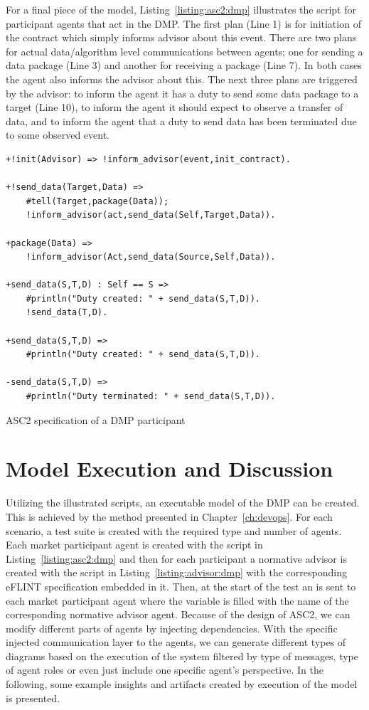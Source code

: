 For a final piece of the model, Listing~\ref{listing:asc2:dmp} illustrates the script for participant agents that act in the DMP. The first plan (Line 1) is for initiation of the contract which simply informs advisor about this event. There are two plans for actual data/algorithm level communications between agents; one for sending a data package (Line 3) and another for receiving a package (Line 7). In both cases the agent also informs the advisor about this. The next three plans are triggered by the advisor: to inform the agent it has a duty to send some data package to a target (Line 10), to inform the agent it should expect to observe a transfer of data, and to inform the agent that a duty to send data has been terminated due to some observed event.

\begin{listing}[!tbh]
\begin{verbatim}
+!init(Advisor) => !inform_advisor(event,init_contract).

+!send_data(Target,Data) =>
    #tell(Target,package(Data));
    !inform_advisor(act,send_data(Self,Target,Data)).

+package(Data) =>
    !inform_advisor(Act,send_data(Source,Self,Data)).

+send_data(S,T,D) : Self == S =>
    #println("Duty created: " + send_data(S,T,D)).
    !send_data(T,D).

+send_data(S,T,D) =>
    #println("Duty created: " + send_data(S,T,D)).

-send_data(S,T,D) =>
    #println("Duty terminated: " + send_data(S,T,D)).
\end{verbatim}
\caption{ASC2 specification of a DMP participant}

\label{listing:asc2:dmp}
\end{listing}

\section{Model Execution and Discussion}
Utilizing the illustrated scripts, an executable model of the DMP can be created. This is achieved by the method presented in Chapter~\ref{ch:devops}. For each scenario, a test suite is created with the required type and number of agents. Each market participant agent is created with the script in Listing~\ref{listing:asc2:dmp} and then for each participant a normative advisor is created with the script in Listing~\ref{listing:advisor:dmp} with the corresponding eFLINT specification embedded in it. Then, at the start of the test an  is sent to each market participant agent where the  variable is filled with the name of the corresponding normative advisor agent. Because of the design of ASC2, we can modify different parts of agents by injecting dependencies. With the specific injected communication layer to the agents, we can generate different types of diagrams based on the execution of the system filtered by type of messages, type of agent roles or even just include one specific agent's perspective. In the following, some example insights and artifacts created by execution of the model is presented.



